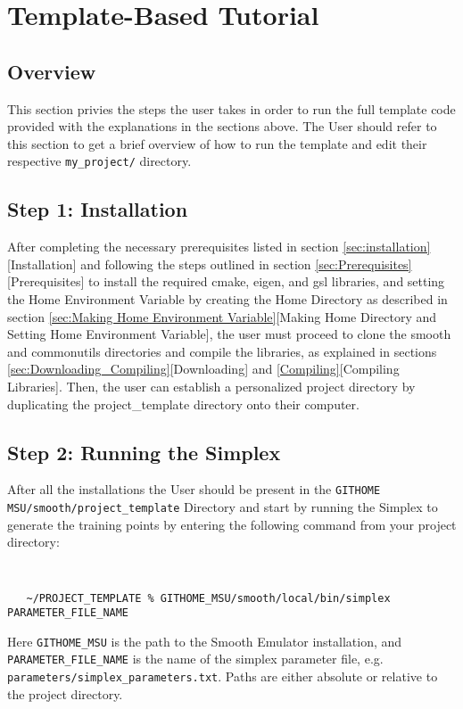 \documentclass[main.tex]{subfiles}
\begin{document}
\setcounter{section}{6}
\section{Template-Based Tutorial}\label{sec:tutorial}

\subsection{Overview}
This section privies the steps the user takes in order to run the full template code provided with the explanations in the sections above. The User should refer to this section to get a brief overview of how to run the template and edit their respective {\tt my\_project/} directory.

\subsection{Step 1: Installation}
After completing the necessary prerequisites listed in section \ref{sec:installation}[Installation] and following the steps outlined in section \ref{sec:Prerequisites}[Prerequisites] to install the required cmake, eigen, and gsl libraries, and setting the Home Environment Variable by creating the Home Directory as described in section \ref{sec:Making Home Environment Variable}[Making Home Directory and Setting Home Environment Variable], the user must proceed to clone the smooth and commonutils directories and compile the libraries, as explained in sections \ref{sec:Downloading_Compiling}[Downloading] and \ref{Compiling}[Compiling Libraries]. Then, the user can establish a personalized project directory by duplicating the project\_template directory onto their computer.

\subsection{Step 2: Running the Simplex}

After all the installations the User should be present in the  {\tt GITHOME MSU/smooth/project\_template} Directory and start by running the Simplex to generate the training points by entering the following command from your project directory:
{\tt
\begin{verbatim}
   ~/PROJECT_TEMPLATE % GITHOME_MSU/smooth/local/bin/simplex PARAMETER_FILE_NAME
\end{verbatim}
}
Here {\tt GITHOME\_MSU} is the path to the Smooth Emulator installation, and {\tt PARAMETER\_FILE\_NAME} is the name of the simplex parameter file, e.g. {\tt parameters/simplex\_parameters.txt}. Paths are either absolute or relative to the project directory.
\end{document}
